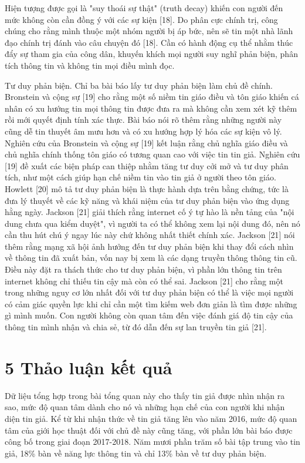 Hiện tượng được gọi là "suy thoái sự thật" (truth decay) khiến con người đến mức không còn cần đồng ý với các sự kiện {[}18{]}. Do phân cực chính trị, công chúng cho rằng mình thuộc một nhóm người bị áp bức, nên sẽ tin một nhà lãnh đạo chính trị đánh vào câu chuyện đó {[}18{]}. Cần có hành động cụ thể nhằm thúc đẩy sự tham gia của công dân, khuyến khích mọi người suy nghĩ phản biện, phân tích thông tin và không tin mọi điều mình đọc.

Tư duy phản biện. Chỉ ba bài báo lấy tư duy phản biện làm chủ đề chính. Bronstein và cộng sự {[}19{]} cho rằng một số niềm tin giáo điều và tôn giáo khiến cá nhân có xu hướng tin mọi thông tin được đưa ra mà không cần xem xét kỹ thêm rồi mới quyết định tính xác thực. Bài báo nói rõ thêm rằng những người này cũng dễ tin thuyết âm mưu hơn và có xu hướng hợp lý hóa các sự kiện vô lý. Nghiên cứu của Bronstein và cộng sự {[}19{]} kết luận rằng chủ nghĩa giáo điều và chủ nghĩa chính thống tôn giáo có tương quan cao với việc tin tin giả. Nghiên cứu {[}19{]} đề xuất các biện pháp can thiệp nhằm tăng tư duy cởi mở và tư duy phân tích, như một cách giúp hạn chế niềm tin vào tin giả ở người theo tôn giáo. Howlett {[}20{]} mô tả tư duy phản biện là thực hành dựa trên bằng chứng, tức là đưa lý thuyết về các kỹ năng và khái niệm của tư duy phản biện vào ứng dụng hằng ngày. Jackson {[}21{]} giải thích rằng internet cố ý tự hào là nền tảng của "nội dung chưa qua kiểm duyệt", vì người ta có thể không xem lại nội dung đó, nên nó cần thu hút chú ý ngay lúc này chứ không nhất thiết chính xác. Jackson {[}21{]} nói thêm rằng mạng xã hội ảnh hưởng đến tư duy phản biện khi thay đổi cách nhìn về thông tin đã xuất bản, vốn nay bị xem là các dạng truyền thông thông tin cũ. Điều này đặt ra thách thức cho tư duy phản biện, vì phần lớn thông tin trên internet không chỉ thiếu tin cậy mà còn có thể sai. Jackson {[}21{]} cho rằng một trong những nguy cơ lớn nhất đối với tư duy phản biện có thể là việc mọi người có cảm giác quyền lực khi chỉ cần một tìm kiếm web đơn giản là tìm được những gì mình muốn. Con người không còn quan tâm đến việc đánh giá độ tin cậy của thông tin mình nhận và chia sẻ, từ đó dẫn đến sự lan truyền tin giả {[}21{]}.

\section{5 Thảo luận kết quả}

Dữ liệu tổng hợp trong bài tổng quan này cho thấy tin giả được nhìn nhận ra sao, mức độ quan tâm dành cho nó và những hạn chế của con người khi nhận diện tin giả. Kể từ khi nhận thức về tin giả tăng lên vào năm 2016, mức độ quan tâm của giới học thuật đối với chủ đề này cũng tăng, với phần lớn bài báo được công bố trong giai đoạn 2017-2018. Năm mươi phần trăm số bài tập trung vào tin giả, 18\% bàn về năng lực thông tin và chỉ 13\% bàn về tư duy phản biện.

